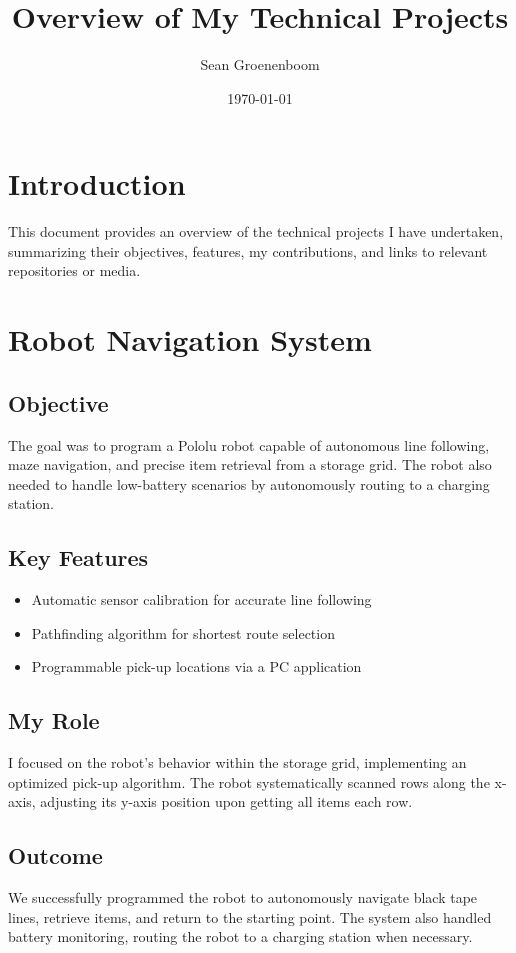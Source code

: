\documentclass{article}
\title{Overview of My Technical Projects}
\author{Sean Groenenboom}
\date{\today}
\begin{document}
\maketitle

\tableofcontents

\section{Introduction}
This document provides an overview of the technical projects I have undertaken, summarizing their objectives, features, my contributions, and links to relevant repositories or media.

\section{Robot Navigation System}
\subsection{Objective}
The goal was to program a Pololu robot capable of autonomous line following, maze navigation, and precise item retrieval from a storage grid. The robot also needed to handle low-battery scenarios by autonomously routing to a charging station.

\subsection{Key Features}
\begin{itemize}
    \item Automatic sensor calibration for accurate line following
    \item Pathfinding algorithm for shortest route selection
    \item Programmable pick-up locations via a PC application
\end{itemize}

\subsection{My Role}
I focused on the robot's behavior within the storage grid, implementing an optimized pick-up algorithm. 
The robot systematically scanned rows along the x-axis, 
adjusting its y-axis position upon getting all items each row. 


\subsection{Outcome}
We successfully programmed the robot to autonomously navigate black tape lines, retrieve items, and return to the starting point. The system also handled battery monitoring, routing the robot to a charging station when necessary.
\end{document}

